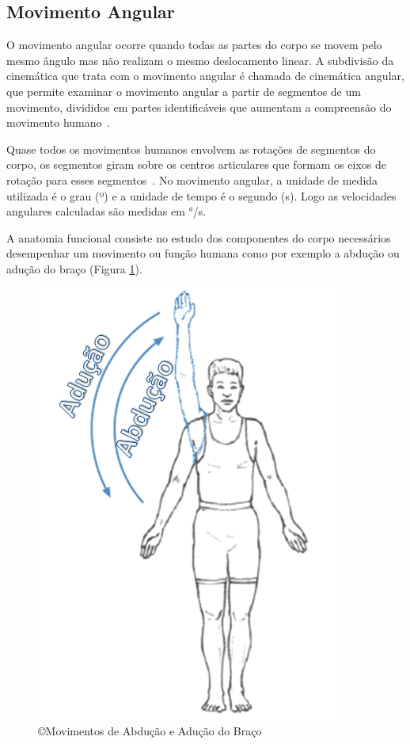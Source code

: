 
\subsection{Movimento Angular}
O movimento angular ocorre quando todas as partes do corpo se movem pelo mesmo ângulo mas não realizam o mesmo deslocamento linear. A subdivisão da cinemática que trata com o movimento angular é chamada de cinemática angular, que permite examinar o movimento angular a partir de segmentos de um movimento, divididos em partes identificáveis que aumentam a compreensão do movimento humano~\cite{hamill1999bases}. 

Quase todos os movimentos humanos envolvem as rotações de segmentos do corpo, os segmentos giram sobre os centros articulares que formam os eixos de rotação para esses segmentos~\cite{hamill1999bases}. No movimento angular, a unidade de medida utilizada é o grau (º) e a unidade de tempo é o segundo (s). Logo as velocidades angulares calculadas são medidas em °/s.

A anatomia funcional consiste no estudo dos componentes do corpo necessários desempenhar um movimento ou função humana como por exemplo a abdução ou adução do braço (Figura \ref{fig:movabducaoaducao}).

\begin{figure}
 \centering
 \includegraphics[scale=0.5]{./img/abducao.png}
\caption[Movimentos de Abdução e Adução do Braço]{\copyright Movimentos de Abdução e Adução do Braço~\cite{mcginnis2013biomechanics}}
 \label{fig:movabducaoaducao}
\end{figure}

